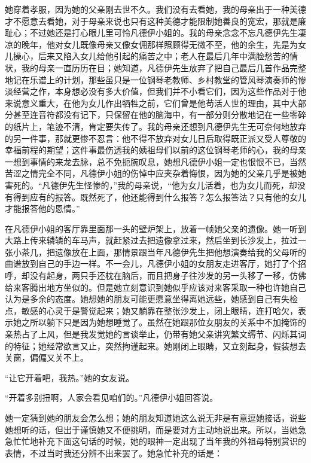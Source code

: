 \par 她穿着孝服，因为她的父亲刚去世不久。我们没有去看她，我的母亲出于一种美德才不愿意去看她，对于母亲来说也只有这种美德才能限制她善良的宽宏，那就是廉耻心；不过她还是打心眼儿里可怜凡德伊小姐的。我的母亲念念不忘凡德伊先生凄凉的晚年，他对女儿既像母亲又像女佣那样照顾得无微不至，他的余生，先是为女儿操心，后来又陷入女儿给他引起的痛苦之中；老人在最后几年中满脸愁苦的情状，我的母亲一直历历在目；她知道，凡德伊先生放弃了把自己最后几首作品完整地记在乐谱上的计划，那些虽只是一位钢琴老教师、乡村教堂的管风琴演奏师的惨淡经营之作，本身想必没有多大价值，但我们并不小看它们，因为这些作品对于他来说意义重大，在他为女儿作出牺牲之前，它们曾是他苟活人世的理由，其中大部分甚至连音符都没有记下，只保留在他的脑海中，有一部分则分散地记在一些零碎的纸片上，笔迹不清，肯定要失传了。我的母亲还想到凡德伊先生无可奈何地放弃的另一件事，那就更惨不忍言：他不得不放弃对女儿日后取得既正派又受人尊敬的幸福前程的期望；这件事最伤透我的姨祖母们以前的这位钢琴老师的心，我的母亲一想到事情的来龙去脉，总不免扼腕叹息，她想凡德伊小姐一定也恨恨不已，当然苦涩之情完全不同，凡德伊小姐的伤悼中应夹杂着悔恨，因为她的父亲几乎是被她害死的。“凡德伊先生怪惨的，”我的母亲说，“他为女儿活着，也为女儿而死，却没有得到应有的报答。既然死了，他还能得到什么报答？怎么报答法？只有他的女儿才能报答他的恩情。”
\par 在凡德伊小姐的客厅靠里面那一头的壁炉架上，放着一帧她父亲的遗像。她一听到大路上传来辚辚的车马声，就赶紧过去把遗像拿过来，然后坐到长沙发上，拉过一张小茶几，把遗像放在上面，那情景跟当年凡德伊先生把他想演奏给我的父母听的曲谱放到自己的手边一样。不一会儿，凡德伊小姐的女朋友走进客厅，她打了个招呼，却没有起身，两只手还枕在脑后，而且把身子往沙发的另一头移了一移，仿佛给来客腾出地方坐似的。但是她立刻意识到她似乎应该对来客采取一种也许她自己认为是多余的态度。她想她的朋友可能更愿意坐得离她远些，她感到自己有失检点，敏感的心灵于是警觉起来；她又躺靠在整张沙发上，闭上眼睛，连打哈欠，表示她之所以躺下只是因为她想睡觉了。虽然在她跟那位女朋友的关系中不加掩饰的亲热占了上风，但是我发觉她的言谈举止，仍带有她父亲讲究繁文缛节、闪烁其词的特征；她经常欲言又止，突然拘谨起来。她刚闭上眼睛，又立刻起身，假装想去关窗，偏偏又关不上。
\par “让它开着吧，我热。”她的女友说。
\par “开着多别扭啊，人家会看见咱们的。”凡德伊小姐回答说。
\par 她一定猜到她的朋友会怎么想；她的朋友知道她这么说无非是有意逗她接话，说些她想听的话，但出于谨慎她又不便挑明，而是要对方主动地说出来。所以，当她急急忙忙地补充下面这句话的时候，她的眼神一定出现了当年我的外祖母特别赏识的表情，不过当时我还分辨不出来罢了。她急忙补充的话是：
